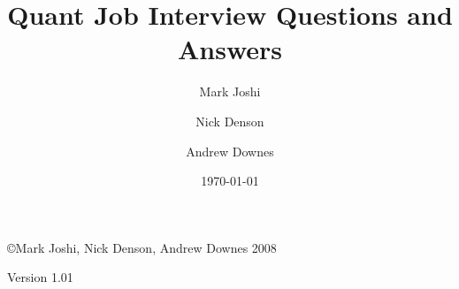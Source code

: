 \documentclass[11pt,righttag,verbatim]{amsbook}
\title{Quant Job Interview Questions and Answers}
\author{Mark Joshi}
\author{Nick Denson}
\author{Andrew Downes}
\date{\today}
\numberwithin{section}{chapter}
\numberwithin{question}{chapter}
\numberwithin{figure}{chapter}
\numberwithin{equation}{chapter}
\begin{document}
\maketitle
\copyright{Mark Joshi, Nick Denson, Andrew Downes 2008}
{\begin{center} Version 1.01 \end{center}}
\setcounter{tocdepth}{2}
\tableofcontents
\cleardoublepage
\cleardoublepage
{}

\begin{thebibliography}{aaa}

\end{thebibliography}
\printindex
\end{document}
